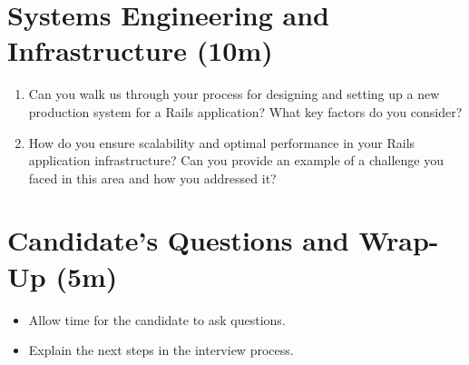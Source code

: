 \documentclass{article}
\begin{document}
\section{Systems Engineering and Infrastructure (10m)}
\begin{enumerate}[resume]
    \item Can you walk us through your process for designing and setting up a new production system for a Rails application? What key factors do you consider?
    \vspace{1.5in}
    \newpage
    \item How do you ensure scalability and optimal performance in your Rails application infrastructure? Can you provide an example of a challenge you faced in this area and how you addressed it?
    \vspace{1.5in}
\end{enumerate}

\section{Candidate’s Questions and Wrap-Up (5m)}
\begin{itemize}
    \item Allow time for the candidate to ask questions.
    \item Explain the next steps in the interview process.
    \vspace{1.5in}
\end{itemize}
\end{document}
